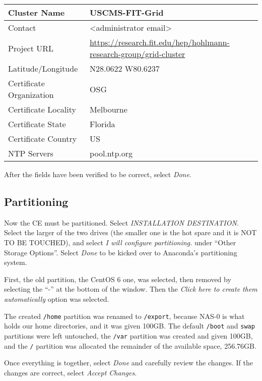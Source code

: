 \documentclass[12pt]{article}
\begin{document}
\begin{center}
  \begin{tabular}{|l|l|}
    \hline
    Cluster Name & USCMS-FIT-Grid \\
    \hline
    Contact & <administrator email> \\
    \hline
    Project URL &
                  \url{https://research.fit.edu/hep/hohlmann-research-group/grid-cluster}
    \\
    \hline
    Latitude/Longitude & N28.0622 W80.6237 \\
    \hline
    Certificate Organization & OSG \\
    \hline
    Certificate Locality & Melbourne \\
    \hline
    Certificate State & Florida \\
    \hline
    Certificate Country & US \\
    \hline
    NTP Servers & pool.ntp.org \\
  \end{tabular}
\end{center}

After the fields have been verified to be correct, select \textit{Done}.

\subsection{Partitioning}

\qq Now the CE must be partitioned. Select \textit{INSTALLATION
  DESTINATION}. Select the larger of the two drives (the smaller one is the hot
spare and it is NOT TO BE TOUCHED), and select \textit{I will configure
  partitioning.} under ``Other Storage Options''. Select \textit{Done} to be
kicked over to Anaconda's partitioning system.

\qq First, the old partition, the CentOS 6 one, was selected, then removed by
selecting the ``-'' at the bottom of the window. Then the \textit{Click here to
  create them automatically} option was selected.

\qq The created {\tt /home} partition was renamed to {\tt /export}, because
NAS-0 is what holds our home directories, and it was given 100GB. The default
{\tt /boot} and {\tt swap} partitions were left untouched, the {\tt /var}
partition was created and given 100GB, and the {\tt /} partition was allocated
the remainder of the available space, 256.76GB.

\qq Once everything is together, select \textit{Done} and carefully review the
changes. If the changes are correct, select \textit{Accept Changes}.
\end{document}
